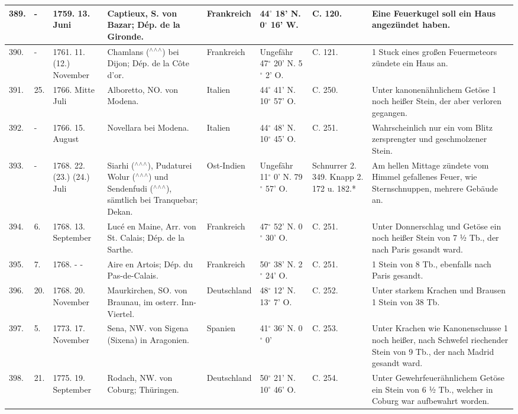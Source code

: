 \documentclass[a4paper, 11pt, oneside, polutonikogreek, german]{article}
\begin{document}
\begin{table}[!ht]
\begin{tabular}{|l|l|l|l|l|l|l|l|}
        389. & - & 1759. 13. Juni & Captieux, S. von Bazar; Dép. de la Gironde. & Frankreich & 44$^\circ$ 18' N. 0$^\circ$ 16' W. & C. 120. & Eine Feuerkugel soll ein Haus angezündet haben. \\ \hline
        390. & - & 1761. 11. (12.) November & Chamlans ($^\wedge$$^\wedge$$^\wedge$) bei Dijon; Dép. de la Côte d’or. & Frankreich & Ungefähr 47$^\circ$ 20' N. 5$^\circ$ 2' O. & C. 121. & 1 Stuck eines großen Feuermeteors zündete ein Haus an. \\ \hline
        391. & 25. & 1766. Mitte Juli & Alboretto, NO. von Modena. & Italien & 44$^\circ$ 41' N. 10$^\circ$ 57' O. & C. 250. & Unter kanonenähnlichem Getöse 1 noch heißer Stein, der aber verloren gegangen. \\ \hline
        392. & - & 1766. 15. August & Novellara bei Modena. & Italien & 44$^\circ$ 48' N. 10$^\circ$ 45' O. & C. 251. & Wahrscheinlich nur ein vom Blitz zersprengter und geschmolzener Stein. \\ \hline
        393. & - & 1768. 22. (23.) (24.) Juli & Siarhi ($^\wedge$$^\wedge$$^\wedge$), Pudaturei Wolur ($^\wedge$$^\wedge$$^\wedge$) und Sendenfudi ($^\wedge$$^\wedge$$^\wedge$), sämtlich bei Tranquebar; Dekan. & Ost-Indien & Ungefähr 11$^\circ$ 0' N. 79$^\circ$ 57' O. & Schnurrer 2. 349. Knapp 2. 172 u. 182.* & Am hellen Mittage zündete vom Himmel gefallenes Feuer, wie Sternschnuppen, mehrere Gebäude an. \\ \hline
        394. & 6. & 1768. 13. September & Lucé en Maine, Arr. von St. Calais; Dép. de la Sarthe. & Frankreich & 47$^\circ$ 52' N. 0$^\circ$ 30' O. & C. 251. & Unter Donnerschlag und Getöse ein noch heißer Stein von 7 ½ Tb., der nach Paris gesandt ward. \\ \hline
        395. & 7. & 1768. - - & Aire en Artois; Dép. du Pas-de-Calais. & Frankreich & 50$^\circ$ 38' N. 2$^\circ$ 24' O. & C. 251. & 1 Stein von 8 Tb., ebenfalls nach Paris gesandt. \\ \hline
        396. & 20. & 1768. 20. November & Maurkirchen, SO. von Braunau, im osterr. Inn-Viertel. & Deutschland & 48$^\circ$ 12' N. 13$^\circ$ 7' O. & C. 252. & Unter starkem Krachen und Brausen 1 Stein von 38 Tb. \\ \hline
        397. & 5. & 1773. 17. November & Sena, NW. von Sigena (Sixena) in Aragonien. & Spanien & 41$^\circ$ 36' N. 0$^\circ$ 0' & C. 253. & Unter Krachen wie Kanonenschusse 1 noch heißer, nach Schwefel riechender Stein von 9 Tb., der nach Madrid gesandt ward. \\ \hline
        398. & 21. & 1775. 19. September & Rodach, NW. von Coburg; Thüringen. & Deutschland & 50$^\circ$ 21' N. 10$^\circ$ 46' O. & C. 254. & Unter Gewehrfeuerähnlichem Getöse ein Stein von 6 ½ Tb., welcher in Coburg war aufbewahrt worden. \\ \hline

\end{tabular}
\end{table}
\end{document}
